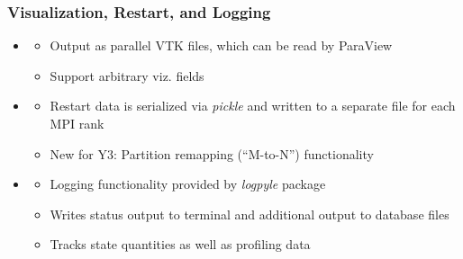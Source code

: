 \begin{frame}[fragile]\frametitle{Visualization, Restart, and Logging}

\begin{itemize}
\item {\large{}}
  \begin{itemize}
  \normalsize
  \item Output as parallel VTK files, which can be read by ParaView
  \item Support arbitrary viz. fields
  \end{itemize}
\item {\large{}}
  \begin{itemize}
  \normalsize
  \item Restart data is serialized via \textit{pickle} and written to a
    separate file for each MPI rank
  \item {\color{myOrange}New for Y3:} Partition remapping (``M-to-N'') functionality 
  \end{itemize}
\item {\large{}}
  \begin{itemize}
  \normalsize
  \item Logging functionality provided by \textit{logpyle} package 
  \item Writes status output to terminal and additional output to database files
  \item Tracks state quantities as well as profiling data
  \end{itemize}
\end{itemize}
\end{frame}


